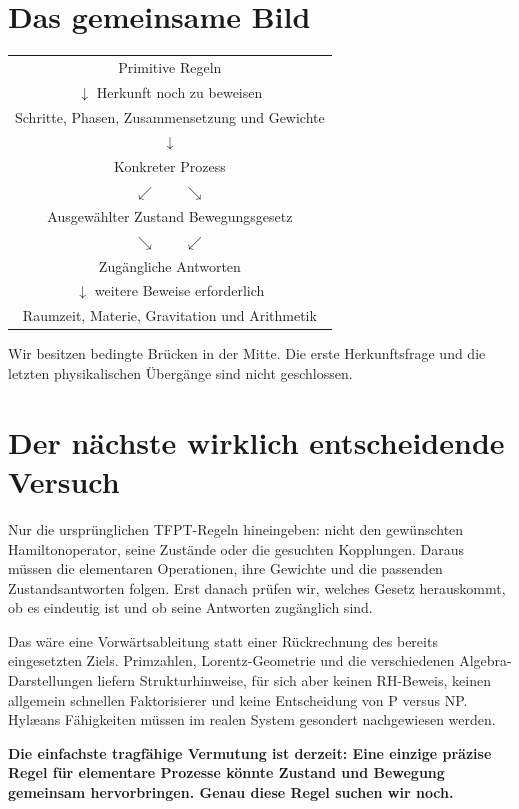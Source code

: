\documentclass[10pt,a4paper]{article}
\begin{document}
\section*{Das gemeinsame Bild}
\begin{center}
\begin{tabular}{c}
Primitive Regeln\\
$\downarrow$ \quad Herkunft noch zu beweisen\\
Schritte, Phasen, Zusammensetzung und Gewichte\\
$\downarrow$\\
Konkreter Prozess\\
$\swarrow\qquad\searrow$\\
Ausgewählter Zustand \quad Bewegungsgesetz\\
$\searrow\qquad\swarrow$\\
Zugängliche Antworten\\
$\downarrow$ \quad weitere Beweise erforderlich\\
Raumzeit, Materie, Gravitation und Arithmetik
\end{tabular}
\end{center}
Wir besitzen bedingte Brücken in der Mitte. Die erste Herkunftsfrage und
die letzten physikalischen Übergänge sind nicht geschlossen.

\section*{Der nächste wirklich entscheidende Versuch}
Nur die ursprünglichen TFPT-Regeln hineingeben: nicht den gewünschten
Hamiltonoperator, seine Zustände oder die gesuchten Kopplungen. Daraus
müssen die elementaren Operationen, ihre Gewichte und die passenden
Zustandsantworten folgen. Erst danach prüfen wir, welches Gesetz herauskommt,
ob es eindeutig ist und ob seine Antworten zugänglich sind.

Das wäre eine Vorwärtsableitung statt einer Rückrechnung des bereits
eingesetzten Ziels. Primzahlen, Lorentz-Geometrie und die verschiedenen
Algebra-Darstellungen liefern Strukturhinweise, für sich aber keinen
RH-Beweis, keinen allgemein schnellen Faktorisierer und keine Entscheidung
von P versus NP. Hyl\ae ans Fähigkeiten müssen im realen System gesondert
nachgewiesen werden.

\textbf{Die einfachste tragfähige Vermutung ist derzeit: Eine einzige
präzise Regel für elementare Prozesse könnte Zustand und Bewegung
gemeinsam hervorbringen. Genau diese Regel suchen wir noch.}
\end{document}
